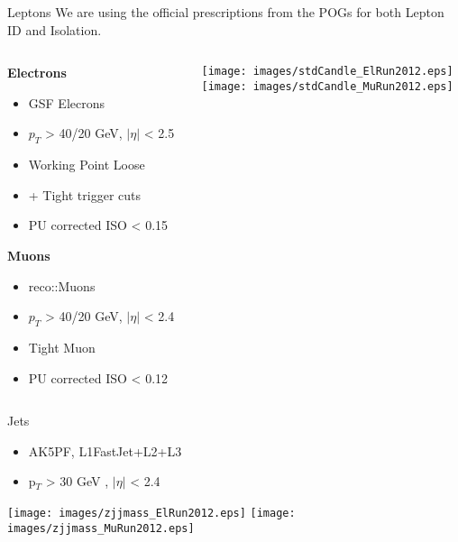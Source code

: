 \begin{frame}{Leptons}
  We are using the official prescriptions from the POGs for both Lepton ID and Isolation.
\begin{columns}
      \begin{column}{0.5\textwidth}
        \begin{center}
  {\bf Electrons}
  \begin{itemize}
    \footnotesize
  \item
    GSF Elecrons
  \item
    $p_{T}$ > 40/20 GeV, $|\eta|$ < 2.5
  \item
    Working Point Loose
  \item
    + Tight trigger cuts
  \item
    PU corrected ISO < 0.15
  \end{itemize}
  \vspace{2em}

  {\bf Muons}
  \begin{itemize}
    \footnotesize
  \item
    reco::Muons
  \item
    $p_{T}$ > 40/20 GeV, $|\eta|$ < 2.4
  \item
    Tight Muon
  \item
    PU corrected ISO < 0.12
  \end{itemize}
  \end{center}
\end{column}
      
      \begin{column}{0.5\textwidth}
        \texttt{[image: images/stdCandle\_ElRun2012.eps]}\\
         \texttt{[image: images/stdCandle\_MuRun2012.eps]}
\end{column}
\end{columns}
\end{frame}




\begin{frame}{Jets}
  
      \begin{itemize}
      \item
        AK5PF, L1FastJet+L2+L3  %
      \item
        p$_{T}$ > 30 GeV , $|\eta|$ < 2.4
      \end{itemize}

  \texttt{[image: images/zjjmass\_ElRun2012.eps]}
  \texttt{[image: images/zjjmass\_MuRun2012.eps]}

\end{frame}

















